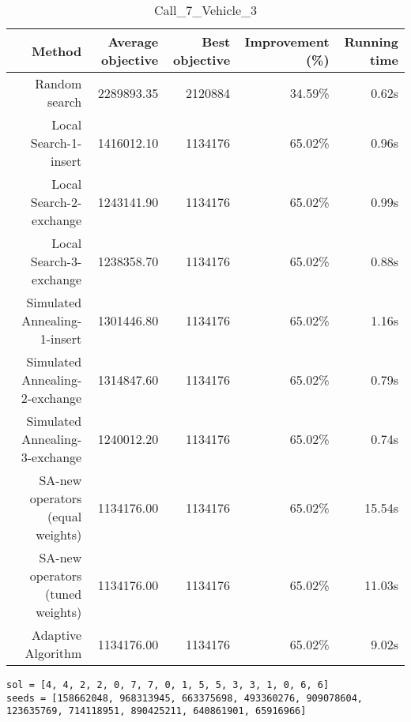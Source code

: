 \begin{table}[ht]
\centering
\caption{Call\_7\_Vehicle\_3}
\label{tab:call7vehicle3}
\begin{tabular}{|r|r|r|r|r|}
Method & Average objective & Best objective & Improvement (\%) & Running time \\
\hline
Random search & 2289893.35 & 2120884 & 34.59\% & 0.62s\\
Local Search-1-insert & 1416012.10 & 1134176 & 65.02\% & 0.96s\\
Local Search-2-exchange & 1243141.90 & 1134176 & 65.02\% & 0.99s\\
Local Search-3-exchange & 1238358.70 & 1134176 & 65.02\% & 0.88s\\
Simulated Annealing-1-insert & 1301446.80 & 1134176 & 65.02\% & 1.16s\\
Simulated Annealing-2-exchange & 1314847.60 & 1134176 & 65.02\% & 0.79s\\
Simulated Annealing-3-exchange & 1240012.20 & 1134176 & 65.02\% & 0.74s\\
SA-new operators (equal weights) & 1134176.00 & 1134176 & 65.02\% & 15.54s\\
SA-new operators (tuned weights) & 1134176.00 & 1134176 & 65.02\% & 11.03s\\
Adaptive Algorithm & 1134176.00 & 1134176 & 65.02\% & 9.02s\\
\end{tabular}%
\end{table}
\begin{lstlisting}[label={lst:call7vehicle3},caption=Optimal solution call\_7\_vehicle\_3]
sol = [4, 4, 2, 2, 0, 7, 7, 0, 1, 5, 5, 3, 3, 1, 0, 6, 6]
seeds = [158662048, 968313945, 663375698, 493360276, 909078604, 123635769, 714118951, 890425211, 640861901, 65916966]
\end{lstlisting}%
\clearpage


